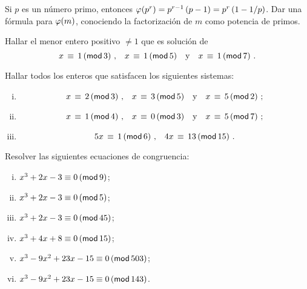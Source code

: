 \begin{ejerChino}\label{ejer:chino:euler}
	Si $p$ es un n\'umero primo, entonces
	$\eulerphi(p^r)=p^{r-1}\,(p-1)=p^r\,(1-1/p)$.
	Dar una f\'ormula para $\eulerphi(m)$, conociendo la
	factorizaci\'on de $m$ como potencia de primos.
\end{ejerChino}

\begin{ejerChino}
	Hallar el menor entero positivo $\neq 1$ que es soluci\'on de
	\begin{displaymath}
		x\,\equiv\,1\tmodulo[3]\dispcomma\quad
		x\,\equiv\,1\tmodulo[5]\dispand
		x\,\equiv\,1\tmodulo[7]
		\dispstop
	\end{displaymath}
\end{ejerChino}

\begin{ejerChino}
	Hallar todos los enteros que satisfacen los siguientes sistemas:
	\begin{enumerate}[(i)]
		\item
			\begin{displaymath}
				x\,\equiv\,2\tmodulo[3]\dispcomma\quad
				x\,\equiv\,3\tmodulo[5]\dispand
				x\,\equiv\,5\tmodulo[2]
				\text{ ;}
			\end{displaymath}
		\item
			\begin{displaymath}
				x\,\equiv\,1\tmodulo[4]\dispcomma\quad
				x\,\equiv\,0\tmodulo[3]\dispand
				x\,\equiv\,5\tmodulo[7]
				\text{ ;}
			\end{displaymath}
		\item
			\begin{displaymath}
				5x\,\equiv\,1\tmodulo[6]\dispcomma\quad
				4x\,\equiv\,13\tmodulo[15]
				\dispstop
			\end{displaymath}
	\end{enumerate}
\end{ejerChino}

\begin{ejerChino}
	Resolver las siguientes ecuaciones de congruencia:
	\begin{enumerate}[(i)]
		\item $x^3+2x-3\equiv 0\tmodulo[9]$;
		\item $x^3+2x-3\equiv 0\tmodulo[5]$;
		\item $x^3+2x-3\equiv 0\tmodulo[45]$;
		\item $x^3+4x+8\equiv 0\tmodulo[15]$;
		\item $x^3-9x^2+23x-15\equiv 0\tmodulo[503]$;%
		\item $x^3-9x^2+23x-15\equiv 0\tmodulo[143]$.
	\end{enumerate}
\end{ejerChino}

